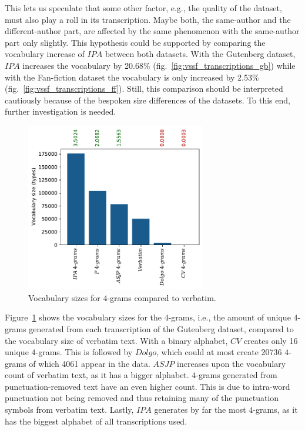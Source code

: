 This lets us speculate that some other factor, e.g., the quality of the dataset, must also play a roll in its transcription.
Maybe both, the same-author and the different-author part, are affected by the same phenomenon with the same-author part only slightly.
This hypothesis could be supported by comparing the vocabulary increase of $IPA$ between both datasets.
With the Gutenberg dataset, $IPA$ increases the vocabulary by 20.68\% (fig.~\ref{fig:vssf_transcriptions_gb}) while with the Fan-fiction dataset the vocabulary is only increased by 2.53\% (fig.~\ref{fig:vssf_transcriptions_ff}).
Still, this comparison should be interpreted cautiously because of the bespoken size differences of the datasets.
To this end, further investigation is needed.\\
\begin{figure}
  \centering
  \includegraphics[width=0.7\textwidth]{figures/vocab_sizes_2021-07-28_14-42-08_gb_ngram}
  \caption{Vocabulary sizes for $4$-grams compared to verbatim.}
  \label{fig:vssf_ngrams_gb}
\end{figure}
Figure~\ref{fig:vssf_ngrams_gb} shows the vocabulary sizes for the $4$-grams, i.e., the amount of unique $4$-grams generated from each transcription of the Gutenberg dataset, compared to the vocabulary size of verbatim text.
With a binary alphabet, $CV$ creates only 16 unique $4$-grams.
This is followed by $Dolgo$, which could at most create 20736 $4$-grams of which 4061 appear in the data.
$ASJP$ increases upon the vocabulary count of verbatim text, as it has a bigger alphabet.
$4$-grams generated from punctuation-removed text have an even higher count.
This is due to intra-word punctuation not being removed and thus retaining many of the punctuation symbols from verbatim text.
Lastly, $IPA$ generates by far the most $4$-grams, as it has the biggest alphabet of all transcriptions used.